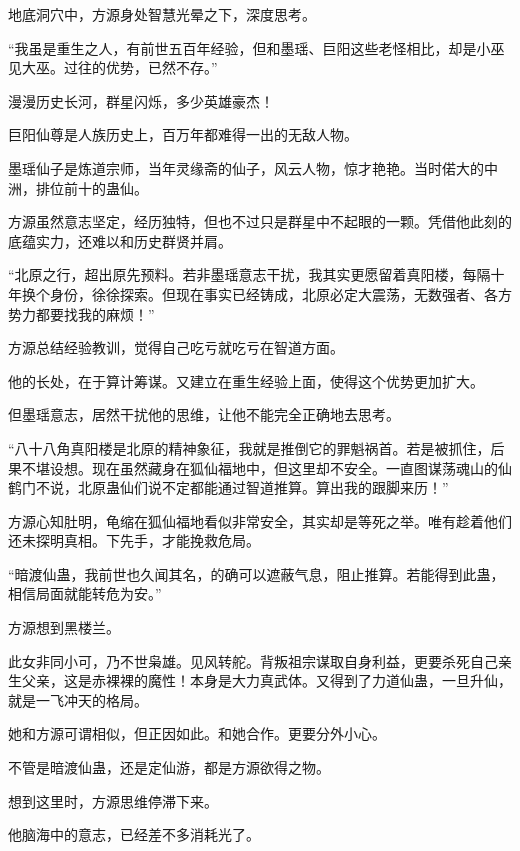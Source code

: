 
\begin{this_body}



地底洞穴中，方源身处智慧光晕之下，深度思考。

“我虽是重生之人，有前世五百年经验，但和墨瑶、巨阳这些老怪相比，却是小巫见大巫。过往的优势，已然不存。”

漫漫历史长河，群星闪烁，多少英雄豪杰！

巨阳仙尊是人族历史上，百万年都难得一出的无敌人物。

墨瑶仙子是炼道宗师，当年灵缘斋的仙子，风云人物，惊才艳艳。当时偌大的中洲，排位前十的蛊仙。

方源虽然意志坚定，经历独特，但也不过只是群星中不起眼的一颗。凭借他此刻的底蕴实力，还难以和历史群贤并肩。

“北原之行，超出原先预料。若非墨瑶意志干扰，我其实更愿留着真阳楼，每隔十年换个身份，徐徐探索。但现在事实已经铸成，北原必定大震荡，无数强者、各方势力都要找我的麻烦！”

方源总结经验教训，觉得自己吃亏就吃亏在智道方面。

他的长处，在于算计筹谋。又建立在重生经验上面，使得这个优势更加扩大。

但墨瑶意志，居然干扰他的思维，让他不能完全正确地去思考。

“八十八角真阳楼是北原的精神象征，我就是推倒它的罪魁祸首。若是被抓住，后果不堪设想。现在虽然藏身在狐仙福地中，但这里却不安全。一直图谋荡魂山的仙鹤门不说，北原蛊仙们说不定都能通过智道推算。算出我的跟脚来历！”

方源心知肚明，龟缩在狐仙福地看似非常安全，其实却是等死之举。唯有趁着他们还未探明真相。下先手，才能挽救危局。

“暗渡仙蛊，我前世也久闻其名，的确可以遮蔽气息，阻止推算。若能得到此蛊，相信局面就能转危为安。”

方源想到黑楼兰。

此女非同小可，乃不世枭雄。见风转舵。背叛祖宗谋取自身利益，更要杀死自己亲生父亲，这是赤裸裸的魔性！本身是大力真武体。又得到了力道仙蛊，一旦升仙，就是一飞冲天的格局。

她和方源可谓相似，但正因如此。和她合作。更要分外小心。

不管是暗渡仙蛊，还是定仙游，都是方源欲得之物。

想到这里时，方源思维停滞下来。

他脑海中的意志，已经差不多消耗光了。


\end{this_body}
